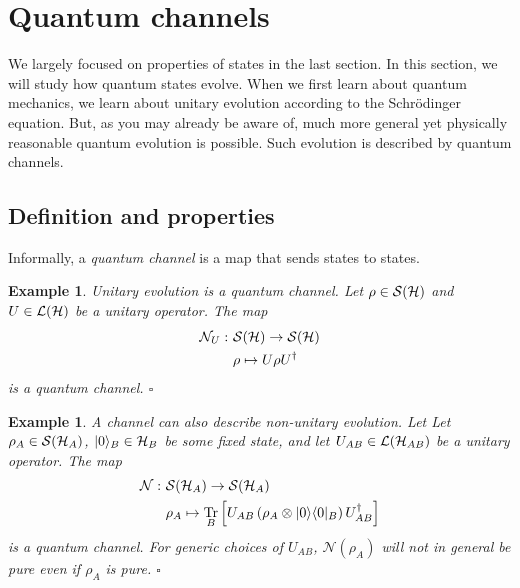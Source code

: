 \documentclass[a4paper,11pt]{article}
\newtheorem{example}[thm]{Example}
\newenvironment{eg}{\begin{example}  \rm  }{    \end{example} }
\newcommand{\eop}{{\hspace*{\fill}$\square$}}
\DeclareMathOperator{\Tr}{Tr}
\newcommand{\ket}[1]{|#1\rangle}
\newcommand{\ketbra}[2]{| #1 \rangle \langle #2 |}
\newcommand{\Hil}{{\cal H}}
\begin{document}
\section{Quantum channels}
\label{sec:channels}

We largely focused on properties of states in the last section.
In this section, we will study how quantum states evolve.
When we first learn about quantum mechanics, we learn about unitary evolution according to the Schr{\"o}dinger equation.
But, as you may already be aware of, much more general yet physically reasonable quantum evolution is possible.
Such evolution is described by quantum channels.

\subsection{Definition and properties}

Informally, a \emph{quantum channel} is a map that sends states to states.
\begin{eg}
Unitary evolution is a quantum channel. Let $\rho \in \mathcal{S}(\Hil)$ and $U \in \mathcal{L}(\Hil)$ be a unitary operator.
The map
\begin{equation}
\begin{aligned}
\mathcal{N}_U : ~ &\mathcal{S}(\Hil) \rightarrow \mathcal{S}(\Hil) \\
& \rho \mapsto U \rho U^\dagger
\end{aligned}
\end{equation}
is a quantum channel.
\eop
\end{eg}

\begin{eg} \label{eg:nonu}
A channel can also describe non-unitary evolution. Let Let $\rho_A \in \mathcal{S}(\Hil_A)$, $\ket{0}_B \in \Hil_B$ be some fixed state, and let $U_{AB} \in \mathcal{L}(\Hil_{AB})$ be a unitary operator.
The map
\begin{equation}
\begin{aligned}
\mathcal{N} : ~ &\mathcal{S}(\Hil_A) \rightarrow \mathcal{S}(\Hil_A) \\
& \rho_A \mapsto \Tr_B\left[ U_{AB} \left(\rho_A \otimes \ketbra{0}{0}_B \right) U_{AB}^\dagger \right]
\end{aligned}
\end{equation}
is a quantum channel.
For generic choices of $U_{AB}$, $\mathcal{N}(\rho_A)$ will not in general be pure even if $\rho_A$ is pure.
\eop
\end{eg}
\end{document}

